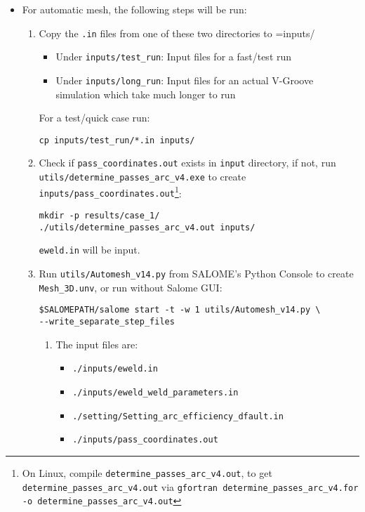 \documentclass[12pt,letterpaper]{article}
\newcommand{\verbStyle}[1]{{\color{SteelBlue40}\colorbox{LightSteelBlue10}{{#1}}}}
\let\OldTexttt\texttt
\renewcommand{\texttt}[1]{\OldTexttt{\verbStyle{#1}}}
\begin{document}
\begin{itemize}
\item For automatic mesh, the following steps will be run:
\begin{enumerate}
\item Copy the \texttt{.in} files from one of these two directories to =inputs/
\begin{itemize}
\item Under \texttt{inputs/test\_run}: Input files for a fast/test run
\item Under \texttt{inputs/long\_run}: Input files for an actual V-Groove simulation which take much longer to run
\end{itemize}
For a test/quick case run: 
\begin{verbatim}
cp inputs/test_run/*.in inputs/
\end{verbatim}
\item Check if \texttt{pass\_coordinates.out} exists in \texttt{input} directory, if not, run \\
\texttt{utils/determine\_passes\_arc\_v4.exe} to create \texttt{inputs/pass\_coordinates.out}\footnote{On Linux, compile \texttt{determine\_passes\_arc\_v4.out}, to get \texttt{determine\_passes\_arc\_v4.out} via \texttt{gfortran determine\_passes\_arc\_v4.for -o determine\_passes\_arc\_v4.out}}:
\begin{verbatim}
mkdir -p results/case_1/
./utils/determine_passes_arc_v4.out inputs/
\end{verbatim}
\texttt{eweld.in} will be input.
\item Run \texttt{utils/Automesh\_v14.py} from SALOME's Python Console to create \texttt{Mesh\_3D.unv}, or run 
without Salome GUI:
\begin{verbatim}
$SALOMEPATH/salome start -t -w 1 utils/Automesh_v14.py \
--write_separate_step_files
\end{verbatim}
\begin{enumerate}
\item The input files are:
\begin{itemize}
\item \texttt{./inputs/eweld.in}
\item \texttt{./inputs/eweld\_weld\_parameters.in}
\item \texttt{./setting/Setting\_arc\_efficiency\_dfault.in}
\item \texttt{./inputs/pass\_coordinates.out}
\end{itemize}


\end{enumerate}
\end{enumerate}
\end{itemize}
\end{document}
